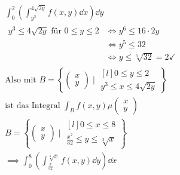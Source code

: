 \begin{bsp}
	\begin{gather*}
		\int_0^2 \left( \int_{y^3}^{4\sqrt{2y}} f(x,y) \dd x \right) \dd y \\
		\begin{split}
			y^3 \leq 4\sqrt{2y} \text{ für } 0 \leq y \leq 2
				&\iff y^6 \leq 16 \cdot 2y \\
				&\iff y^5 \leq 32 \\
				&\iff y \leq \sqrt[5]{32} = 2 \checkmark
		\end{split} \\
		\text{Also mit } B = \left\{ \begin{pmatrix} x \\ y \end{pmatrix} \mid \begin{matrix*}[l] 0 \leq y \leq 2 \\ y^3 \leq x \leq 4\sqrt{2y} \end{matrix*} \right\} \\
		\text{ist das Integral } \int_B f(x,y) \mu\begin{pmatrix} x \\ y \end{pmatrix} \\
		B = \left\{ \begin{pmatrix} x \\ y \end{pmatrix} \mid \begin{matrix*}[l] 0 \leq x \leq 8 \\ \frac{x^2}{32} \leq y \leq \sqrt[3]{x} \end{matrix*} \right\} \\
		\implies \int_0^8 \left( \int_{\frac{x}{32}}^{\sqrt[3]{x}} f(x,y) \dd y \right) \dd x 
	\end{gather*}
\end{bsp}
